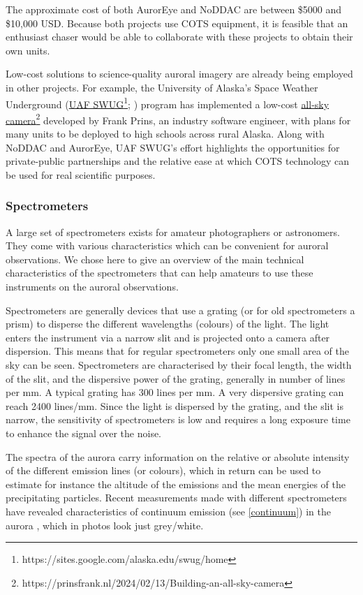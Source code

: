 \documentclass{article}
\renewcommand{\cite}[1]{\parencite{#1}}
\begin{document}
The approximate cost of both AurorEye and NoDDAC are between \$5000 and \$10,000 USD. Because both projects use COTS equipment, it is feasible that an enthusiast chaser would be able to collaborate with these projects to obtain their own units.

Low-cost solutions to science-quality auroral imagery are already being employed in other projects. For example, the University of Alaska's Space Weather Underground (\href{https://sites.google.com/alaska.edu/swug/home}{UAF SWUG}\footnote{https://sites.google.com/alaska.edu/swug/home}; \cite{cohen2024}) program has implemented a low-cost \href{https://prinsfrank.nl/2024/02/13/Building-an-all-sky-camera}{all-sky camera}\footnote{https://prinsfrank.nl/2024/02/13/Building-an-all-sky-camera} developed by Frank Prins, an industry software engineer, with plans for many units to be deployed to high schools across rural Alaska. Along with NoDDAC and AurorEye, UAF SWUG's effort highlights the opportunities for private-public partnerships and the relative ease at which COTS technology can be used for real scientific purposes.

\subsubsection{Spectrometers}
A large set of spectrometers exists for amateur photographers or astronomers. They come with various characteristics which can be convenient for auroral observations. We chose here to give an overview of the main technical characteristics of the spectrometers that can help amateurs to use these instruments on the auroral observations.

Spectrometers are generally devices that use a grating (or for old spectrometers a prism) to disperse the different wavelengths (colours) of the light. The light enters the instrument via a narrow slit and is projected onto a camera after dispersion. This means that for regular spectrometers only one small area of the sky can be seen. 
Spectrometers are characterised by their focal length, the width of the slit, and the dispersive power of the grating, generally in number of lines per mm. A typical grating has 300 lines per mm. A very dispersive grating can reach 2400 lines/mm. Since the light is dispersed by the grating, and the slit is narrow, the sensitivity of spectrometers is low and requires a long exposure time to enhance the signal over the noise.

The spectra of the aurora carry information on the relative or absolute intensity of the different emission lines (or colours), which in return can be used to estimate for instance the altitude of the emissions and the mean energies of the precipitating particles. Recent measurements made with different spectrometers have revealed characteristics of continuum emission (see \ref{continuum}) in the aurora \cite{Gillies2019}, which in photos look just grey/white.
\end{document}
